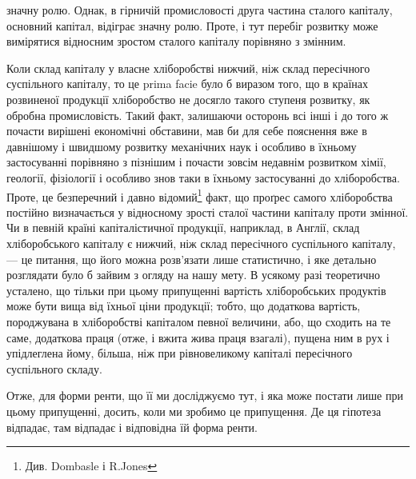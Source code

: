\parcont{}  %
значну ролю. Однак, в гірничій промисловості друга частина сталого капіталу, основний капітал,
відіграє значну ролю. Проте, і тут перебіг розвитку може вимірятися відносним зростом сталого
капіталу порівняно з змінним.

Коли склад капіталу у власне хліборобстві нижчий, ніж склад пересічного
суспільного капіталу, то це prima facie було б виразом того, що в країнах
розвиненої продукції хліборобство не досягло такого ступеня розвитку, як обробна промисловість.
Такий факт, залишаючи осторонь всі інші і до того ж почасти вирішені економічні обставини, мав би
для себе пояснення вже в давнішому і швидшому розвитку механічних наук і особливо в їхньому
застосуванні порівняно з пізнішим і почасти зовсім недавнім розвитком хімії, геології, фізіології і
особливо знов таки в їхньому застосуванні до хліборобства. Проте, це безперечний і давно відомий\footnote{Див. Dombasle і R.Jones}
факт, що проґрес самого хліборобства постійно визначається у відносному зрості сталої частини
капіталу проти змінної. Чи в певній країні капіталістичної продукції, наприклад, в Англії, склад
хліборобського капіталу є нижчий, ніж склад пересічного суспільного капіталу, — це питання, що його
можна розв’язати лише статистично, і яке детально розглядати було б зайвим з огляду на нашу мету. В
усякому разі теоретично усталено, що тільки при цьому припущенні вартість хліборобських продуктів
може бути вища від їхньої ціни продукції; тобто, що додаткова вартість, породжувана в хліборобстві
капіталом певної величини, або, що сходить на те саме, додаткова праця (отже, і вжита жива праця
взагалі), пущена ним в рух і упідлеглена йому, більша, ніж при рівновеликому капіталі пересічного
суспільного складу.

Отже, для форми ренти, що її ми досліджуємо тут, і яка може постати лише
при цьому припущенні, досить, коли ми зробимо це припущення. Де ця гіпотеза
відпадає, там відпадає і відповідна їй форма ренти.

